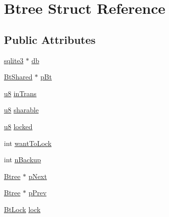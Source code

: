 \hypertarget{struct_btree}{\section{Btree Struct Reference}
\label{struct_btree}
}
\subsection*{Public Attributes}
\begin{DoxyCompactItemize}
\item 
\hyperlink{structsqlite3}{sqlite3} $\ast$ \hyperlink{struct_btree_a2b3cfec48b6e9fcfd641d433816ae5c3}{db}
\item 
\hyperlink{struct_bt_shared}{Bt\-Shared} $\ast$ \hyperlink{struct_btree_a63bab5d744d48d14368af048dddf2f20}{p\-Bt}
\item 
\hyperlink{sqlite3_8c_a74a0f6424ae628af25f23f0a35f6ead3}{u8} \hyperlink{struct_btree_a50007448960c05dfd1fdc7db3e277685}{in\-Trans}
\item 
\hyperlink{sqlite3_8c_a74a0f6424ae628af25f23f0a35f6ead3}{u8} \hyperlink{struct_btree_a114f157127c76a1fbad8292e4b39c4dd}{sharable}
\item 
\hyperlink{sqlite3_8c_a74a0f6424ae628af25f23f0a35f6ead3}{u8} \hyperlink{struct_btree_a16fc8292bae9a66cfec03f6cb82d06a8}{locked}
\item 
int \hyperlink{struct_btree_a97368ea300f0b74b8e80ea07da0cea2a}{want\-To\-Lock}
\item 
int \hyperlink{struct_btree_a7a3e7cf38bc9c3021a9e270a54ecfb1e}{n\-Backup}
\item 
\hyperlink{struct_btree}{Btree} $\ast$ \hyperlink{struct_btree_a9e6d2ca44c10ed8ef0be004225a74ef5}{p\-Next}
\item 
\hyperlink{struct_btree}{Btree} $\ast$ \hyperlink{struct_btree_a0423f1c55c1fe6812161a49bb2bf604f}{p\-Prev}
\item 
\hyperlink{struct_bt_lock}{Bt\-Lock} \hyperlink{struct_btree_a943ed8799c9943f753a88cf44f1632dc}{lock}
\end{DoxyCompactItemize}


